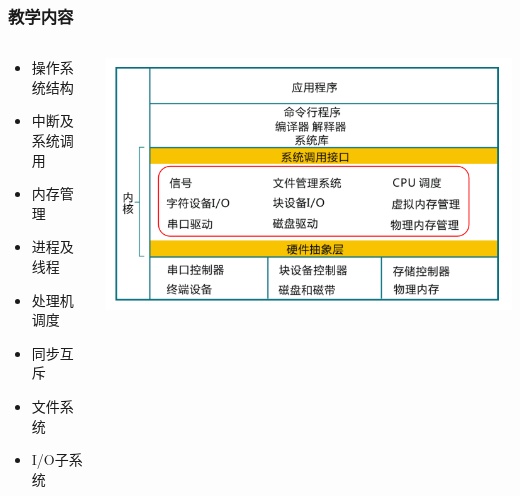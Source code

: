 \documentclass[UTF8]{ctexbeamer}
\begin{document}
\begin{frame}
	\frametitle{教学内容}

	\begin{columns}
	
	\begin{column}{0.5\textwidth}
	
    \begin{itemize}
		\item 操作系统结构
		\item 中断及系统调用
		\item 内存管理
		\item 进程及线程
		\item 处理机调度
		\item 同步互斥
		\item 文件系统
		\item I/O子系统
    \end{itemize}
    
    \end{column}

	\begin{column}{0.5\textwidth}
	
    \includegraphics[width=1\linewidth]{ucore-arch}
    
    \end{column}
    
\end{columns}

\end{frame}

\end{document}
